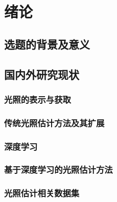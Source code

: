 \chapter{绪论}\label{chap:introduction}

\section{选题的背景及意义}

\section{国内外研究现状}
\subsection{光照的表示与获取}
\subsection{传统光照估计方法及其扩展}
\subsection{深度学习}
\subsection{基于深度学习的光照估计方法}
\subsection{光照估计相关数据集}

